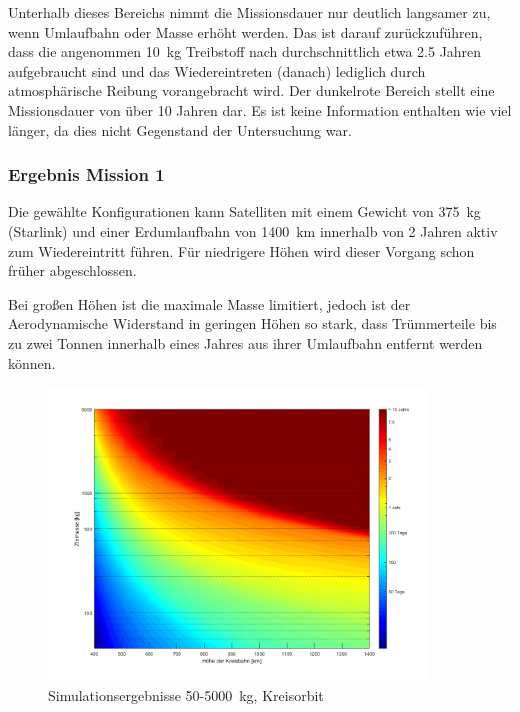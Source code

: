  Unterhalb dieses Bereichs nimmt die Missionsdauer nur deutlich langsamer zu, wenn Umlaufbahn oder Masse erhöht werden. Das ist darauf zurückzuführen, dass die angenommen \SI{10}{\kg} Treibstoff nach durchschnittlich etwa \num{2.5} Jahren aufgebraucht sind und das Wiedereintreten (danach) lediglich durch atmosphärische Reibung vorangebracht wird. Der dunkelrote Bereich stellt eine Missionsdauer von über \num{10} Jahren dar. Es ist keine Information enthalten wie viel länger, da dies nicht Gegenstand der Untersuchung war.
\subsubsection{Ergebnis Mission 1}
	

Die gewählte Konfigurationen kann Satelliten mit einem Gewicht von \SI{375}{\kilogram} (Starlink) und einer Erdumlaufbahn von \SI{1400}{\kilo\metre} innerhalb von \num{2} Jahren aktiv zum Wiedereintritt führen. Für niedrigere Höhen wird dieser Vorgang schon früher abgeschlossen. 

	Bei großen Höhen ist die maximale Masse limitiert, jedoch ist der Aerodynamische Widerstand in geringen Höhen so stark, dass Trümmerteile bis zu zwei Tonnen innerhalb eines Jahres aus ihrer Umlaufbahn entfernt werden können. 


\begin{figure}[t]
\centering
\includegraphics[width=0.90\textwidth]{./graphics/GMAT/GMAT_Mass_over_Height.png}
\caption{Simulationsergebnisse \num{50}-\SI{5000}{\kilogram}, Kreisorbit}
\label{fig:GMAT_Mass_over_Height}
\end{figure}

	

